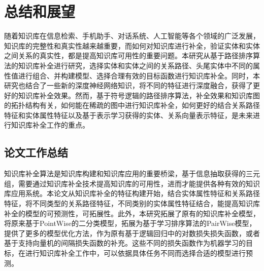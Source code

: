
\chapter{总结和展望}
\label{cha:kbc-summary}
随着知识库在信息检索、手机助手、对话系统、人工智能等各个领域的广泛发展，知识库的完整性和真实性越来越重要，而如何对知识库进行补全，验证实体和实体之间关系的真实性，都是提高知识库可用性的重要问题。本研究从基于路径排序算法的知识库补全进行研究，选择实体和实体之间的关系路径、头尾实体中不同的属性值进行组合、并构建模型、选择合理有效的目标函数进行知识库补全。同时，本研究也结合了一些新的深度神经网络知识，将不同的特征进行深度融合，获得了更好的知识库补全效果。然而，基于符号逻辑的路径排序算法，补全效果和知识库图的拓扑结构有关，如何能在稀疏的图中进行知识库补全，如何更好的结合关系路径特征和实体属性特征以及基于表示学习获得的实体、关系向量表示特征，是未来进行知识库补全工作的重点。

\section{论文工作总结}
知识库补全算法是知识库构建和知识库应用的重要桥梁，基于信息抽取获得的三元组，需要通过知识库补全技术提高知识库的可用性，进而才能提供各种有效的知识库应用系统。本论文从知识库补全的特征构建开始，结合实体属性特征和关系路径特征，将不同类型的关系路径特征，不同类别的实体属性特征结合，能提高知识库补全的模型的可预测性，可拓展性。此外，本研究拓展了原有的知识库补全模型，将原来基于PointWise的二分类模型，拓展为基于学习排序算法的PairWise模型，提供了更多的模型优化方法，作为原有基于逻辑回归中的对数损失损失函数，或者基于支持向量机的间隔损失函数的补充。这些不同的损失函数作为机器学习的目标，在进行知识库补全工作中，可以依据具体任务不同而选择合适的模型进行预测。

